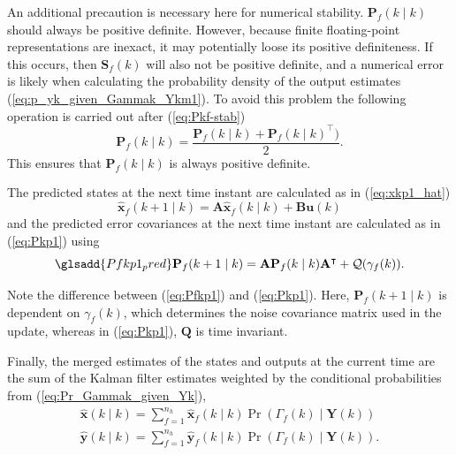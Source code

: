 An additional precaution is necessary here for numerical stability. $\mathbf{P}_f(k \mid k)$ should always be positive definite. However, because finite floating-point representations are inexact, it may potentially loose its positive definiteness. If this occurs, then $\mathbf{S}_f(k)$ will also not be positive definite, and a numerical error is likely when calculating the probability density of the output estimates (\ref{eq:p_yk_given_Gammak_Ykm1}). To avoid this problem the following operation is carried out after (\ref{eq:Pkf-stab})
\begin{equation} \label{eq:Pkf-psd-fix}
	\mathbf{P}_f(k \mid k) = \frac{ \mathbf{P}_f(k \mid k) + \mathbf{P}_f(k \mid k)^\intercal )}{2}. 
\end{equation}
This ensures that $\mathbf{P}_f(k \mid k)$ is always positive definite.

The predicted states at the next time instant are calculated as in (\ref{eq:xkp1_hat})
\begin{equation} \label{eq:xfkp1_hat}
	\mathbf{\hat{x}}_f(k+1 \mid k) = \mathbf{A} \mathbf{\hat{x}}_f(k \mid k) + \mathbf{B} \mathbf{u}(k)
\end{equation}
and the predicted error covariances at the next time instant are calculated as in (\ref{eq:Pkp1}) using
\begin{equation} \label{eq:Pfkp1} \glsadd{Pfkp1_pred}
	\mathbf{P}_f(k+1 \mid k) = \mathbf{A} \mathbf{P}_f(k \mid k)  \mathbf{A}^\intercal  + \mathcal{Q}(\gamma_f(k)).
\end{equation}

Note the difference between (\ref{eq:Pfkp1}) and (\ref{eq:Pkp1}).  Here, $\mathbf{P}_f(k+1 \mid k)$ is dependent on $\gamma_f(k)$, which determines the noise covariance matrix used in the update, whereas in (\ref{eq:Pkp1}), $\mathbf{Q}$ is time invariant.

Finally, the merged estimates of the states and outputs at the current time are the sum of the Kalman filter estimates weighted by the conditional probabilities from (\ref{eq:Pr_Gammak_given_Yk}),
\begin{equation} \label{eq:xkyk_hat_MKF}
	\begin{aligned}
		\mathbf{\hat{x}}(k \mid k) = \sum_{f=1}^{n_h} \mathbf{\hat{x}}_f(k \mid k) \Pr(\Gamma_f(k) \mid \mathbf{Y}(k)) \\
		\mathbf{\hat{y}}(k \mid k) = \sum_{f=1}^{n_h} \mathbf{\hat{y}}_f(k \mid k) \Pr(\Gamma_f(k) \mid \mathbf{Y}(k)).
	\end{aligned}
\end{equation}

